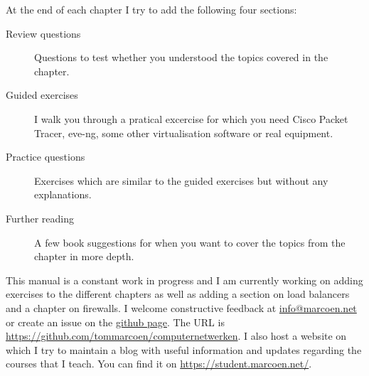 At the end of each chapter I try to add the following four sections:
\begin{description}
\item[Review questions] Questions to test whether you understood the topics covered in the chapter.
\item[Guided exercises] I walk you through a pratical excercise for which you need Cisco Packet Tracer, eve-ng, some other virtualisation software or real equipment.
\item[Practice questions] Exercises which are similar to the guided exercises but without any explanations.
\item[Further reading] A few book suggestions for when you want to cover the topics from the chapter in more depth.
\end{description}

This manual is a constant work in progress and I am currently working on adding exercises to the different chapters as well as adding a section on load balancers and a chapter on firewalls.
I welcome constructive feedback at \href{mailto:info@marcoen.net}{info@\-marcoen.net} or create an issue on the \href{https://github.com/tommarcoen/computernetwerken}{github page}.
The \acs{URL} is \url{https://github.com/tommarcoen/computernetwerken}.
I also host a website on which I try to maintain a blog with useful information and updates regarding the courses that I teach.
You can find it on \url{https://student.marcoen.net/}.



